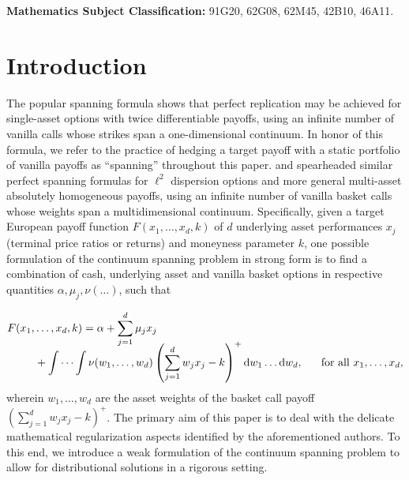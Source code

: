 \documentclass[11pt,A4,twoside]{article}
\numberwithin{equation}{section}
\renewcommand*\d{\mathop{}\!\mathrm{d}}
\def\qqq{\;\;\;\;\;\;\;\;\;}
\def\qq{\;\;\;\;\;\;}
\newcommand{\beqa}{\begin{eqnarray}}
\newcommand{\eeqa}{\end{eqnarray}}
\def\bal{\begin{aligned}}
\def\eal{\end{aligned}}
\def\bll#1{
\beqa\label{#1}\bal
}\def\lel{\eal\eeqa}
\newcommand{\beql}[1]{\bll{#1}}
\newcommand{\eeql}{\lel}
\theoremstyle{definition}
\theoremstyle{remark}
\def\cdots{\dots}
\begin{document}
 
\vspace{2mm}
\noindent
\textbf{Mathematics Subject Classification:}  
91G20, %
62G08, %
62M45, %
42B10, %
46A11. %

\section{Introduction}


The popular \cite{carr-madan:1998} spanning formula shows that perfect
replication  may be achieved  
for single-asset options with twice differentiable payoffs,
using an infinite number of vanilla calls whose strikes span a one-dimensional continuum.  In honor of this formula, we refer to the practice of hedging a target payoff with a static portfolio of vanilla payoffs as ``spanning'' throughout this paper.
 \citet*{bossu-carr-papanicolaou:2022} and \cite{bossu2021static} spearheaded similar perfect spanning formulas for $\ell^2$ dispersion options and more general multi-asset absolutely homogeneous payoffs, using an infinite number of vanilla basket calls whose weights span a multidimensional continuum. Specifically, given a target European payoff function $F(x_1, \cdots, x_d,k )$ of $d$ underlying asset performances $x_j$ (terminal price ratios or returns) and moneyness parameter $k$, one possible formulation of the continuum spanning problem in strong form is to find a combination of cash, underlying asset and vanilla basket options in respective quantities $\alpha, \mu_j, \nu(\cdots)$, such that
\beql{eq:repli-strong}
    & F(x_1, \cdots, x_d, k) = \alpha + \sum_{j=1}^d \mu_j x_j
    \\[-9pt]
    & \qqq + \idotsint \nu(w_1, \cdots, w_d) \left(\sum_{j=1}^d w_j x_j - k\right)^+ \d w_1 \cdots \d w_d,
    \qq \text{for all }x_1, \cdots, x_d, 
\eeql
wherein $w_1, \cdots, w_d$ are the asset weights of the basket call payoff $ \left(\sum_{j=1}^d w_j x_j - k\right)^+ $.  The primary aim of this paper is to deal with the delicate mathematical regularization aspects identified by the aforementioned authors.
To this end, we introduce a weak formulation of the continuum spanning problem to allow for distributional solutions in a rigorous setting.
\end{document}
